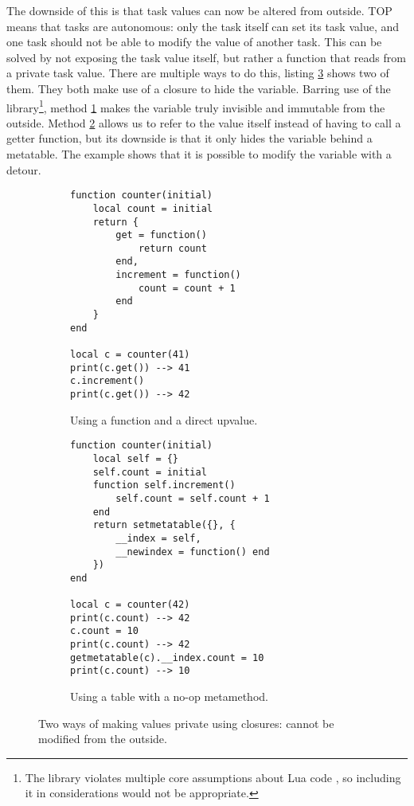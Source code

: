 The downside of this is that task values can now be altered from outside. TOP means that tasks are autonomous: only the task itself can set its task value, and one task should not be able to modify the value of another task. This can be solved by not exposing the task value itself, but rather a function that reads from a private task value. There are multiple ways to do this, listing \ref{lst:lua_private} shows two of them. They both make use of a closure to hide the variable. Barring use of the  library\footnote{The  library violates multiple core assumptions about Lua code \cite{luareferencemanual}, so including it in considerations would not be appropriate.}, method \ref{lst:lua_private_a} makes the  variable truly invisible and immutable from the outside. Method \ref{lst:lua_private_b} allows us to refer to the value itself instead of having to call a getter function, but its downside is that it only hides the  variable behind a metatable. The example shows that it is possible to modify the variable with a detour.

\begin{figure}[ht]
\centering
\begin{subfigure}{0.40\textwidth}
\begin{verbatim}
function counter(initial)
    local count = initial
    return {
        get = function()
            return count
        end,
        increment = function()
            count = count + 1
        end
    }
end

local c = counter(41)
print(c.get()) --> 41
c.increment()
print(c.get()) --> 42
\end{verbatim}
\caption{Using a  function and a direct  upvalue.}
\label{lst:lua_private_a}
\end{subfigure}
\hspace{0.09\textwidth}
\begin{subfigure}{0.40\textwidth}
\begin{verbatim}
function counter(initial)
    local self = {}
    self.count = initial
    function self.increment()
        self.count = self.count + 1
    end
    return setmetatable({}, {
        __index = self,
        __newindex = function() end
    })
end

local c = counter(42)
print(c.count) --> 42
c.count = 10
print(c.count) --> 42
getmetatable(c).__index.count = 10
print(c.count) --> 10
\end{verbatim}
\caption{Using a table with a no-op  metamethod.}
\label{lst:lua_private_b}
\end{subfigure}
\caption{Two ways of making values private using closures:  cannot be modified from the outside.}
\label{lst:lua_private}
\end{figure}

